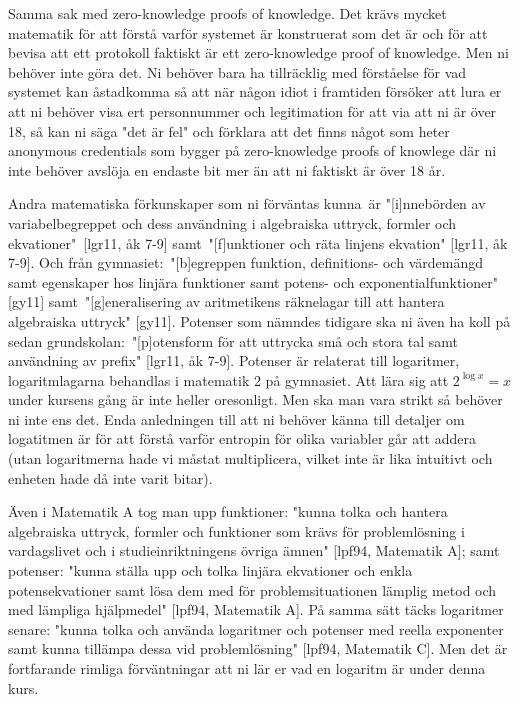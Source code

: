 Samma sak med zero-knowledge proofs of knowledge. Det krävs mycket matematik 
för att förstå varför systemet är konstruerat som det är och för att bevisa att
ett protokoll faktiskt är ett zero-knowledge proof of knowledge. Men ni behöver
inte göra det. Ni behöver bara ha tillräcklig med förståelse för vad systemet 
kan åstadkomma så att när någon idiot i framtiden försöker att lura er att ni 
behöver visa ert personnummer och legitimation för att via att ni är över 18, 
så kan ni säga "det är fel" och förklara att det finns något som heter 
anonymous credentials som bygger på zero-knowledge proofs of knowlege där ni 
inte behöver avslöja en endaste bit mer än att ni faktiskt är över 18 år.

Andra matematiska förkunskaper som ni förväntas kunna är "[i]nnebörden 
av variabelbegreppet och dess användning i algebraiska uttryck, formler 
och ekvationer" [lgr11, åk 7-9] samt "[f]unktioner och räta linjens 
ekvation" [lgr11, åk 7-9].  Och från gymnasiet: "[b]egreppen funktion, 
definitions- och värdemängd samt egenskaper hos linjära funktioner samt 
potens- och exponentialfunktioner" [gy11] samt "[g]eneralisering av 
aritmetikens räknelagar till att hantera algebraiska uttryck" [gy11].  
Potenser som nämndes tidigare ska ni även ha koll på sedan 
grundskolan: "[p]otensform för att uttrycka små och stora tal samt 
användning av prefix" [lgr11, åk 7-9]. Potenser är relaterat till 
logaritmer, logaritmlagarna behandlas i matematik 2 på gymnasiet. Att 
lära sig att $2^{\log x} = x$ under kursens gång är inte heller 
oresonligt. Men ska man vara strikt så behöver ni inte ens det. Enda 
anledningen till att ni behöver känna till detaljer om logatitmen är för 
att förstå varför entropin för olika variabler går att addera (utan 
logaritmerna hade vi måstat multiplicera, vilket inte är lika intuitivt 
och enheten hade då inte varit bitar).

Även i Matematik A tog man upp funktioner: "kunna tolka och hantera 
algebraiska uttryck, formler och funktioner som krävs för problemlösning 
i vardagslivet och i studieinriktningens övriga ämnen" [lpf94, Matematik 
A]; samt potenser: "kunna ställa upp och tolka linjära ekvationer och enkla 
potensekvationer samt lösa dem med för problemsituationen lämplig metod 
och med lämpliga hjälpmedel" [lpf94, Matematik A]. På samma sätt täcks 
logaritmer senare: "kunna tolka och använda logaritmer och potenser med 
reella exponenter samt kunna tillämpa dessa vid problemlösning" [lpf94, 
Matematik C]. Men det är fortfarande rimliga förväntningar att ni lär er 
vad en logaritm är under denna kurs.

